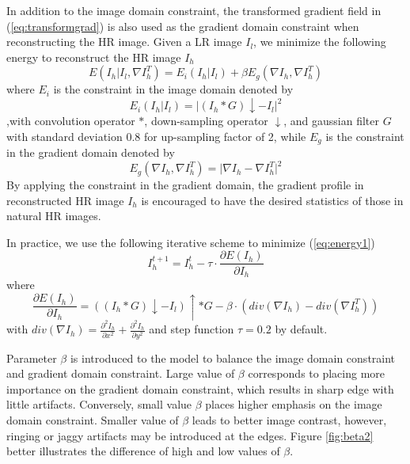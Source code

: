 \documentclass[a4paper,11pt]{article}
\begin{document}
In addition to the image domain constraint, the transformed gradient field in (\ref{eq:transformgrad}) is also used as the gradient domain constraint when reconstructing the HR image. Given a LR image $I_l$, we minimize the following energy to reconstruct the HR image $I_h$
\begin{equation}
	\label{eq:energy1}
	E(I_h | I_l, \nabla I_h^T) = E_i(I_h | I_l) + \beta E_g(\nabla I_h, \nabla I_h^T) 
\end{equation}
where $E_i$ is the constraint in the image domain denoted by
\begin{equation}
	\label{eq:energyi}
	E_i(I_h | I_l) = \lvert (I_h \ast G) \downarrow - I_l \rvert^2
\end{equation}
,with convolution operator $\ast$, down-sampling operator $\downarrow$, and gaussian filter $G$ with standard deviation 0.8 for up-sampling factor of 2, while $E_g$ is the constraint in the gradient domain denoted by
\begin{equation}
	\label{eq:energyg}
	E_g(\nabla I_h, \nabla I_h^T) = \lvert \nabla I_h - \nabla I_h^T \rvert^2
\end{equation}
By applying the constraint in the gradient domain, the gradient profile in reconstructed HR image $I_h$ is encouraged to have the desired statistics of those in natural HR images.

In practice, we use the following iterative scheme to minimize (\ref{eq:energy1})
\begin{equation}
	I_h^{t+1} = I_h^t - \tau \cdot \frac{\partial E(I_h)}{\partial I_h}
\end{equation}
where
\begin{equation}
	\frac{\partial E(I_h)}{\partial I_h} = ((I_h \ast G) \downarrow - I_l) \uparrow \ast G - \beta \cdot (div(\nabla I_h) - div(\nabla I_h^T))
\end{equation}
 with $div(\nabla I_h) = \frac{\partial^2 I_h}{\partial x^2} + \frac{\partial^2 I_h}{\partial y^2}$ and step function $\tau =0.2$ by default.

Parameter $\beta$ is introduced to the model to balance the image domain constraint and gradient domain constraint. Large value of $\beta$ corresponds to placing more importance on the gradient domain constraint, which results in sharp edge with little artifacts. Conversely, small value $\beta$ places higher emphasis on the image domain constraint. Smaller value of $\beta$ leads to better image contrast, however, ringing or jaggy artifacts may be introduced at the edges. Figure \ref{fig:beta2} better illustrates the difference of high and low values of $\beta$.
\end{document}
